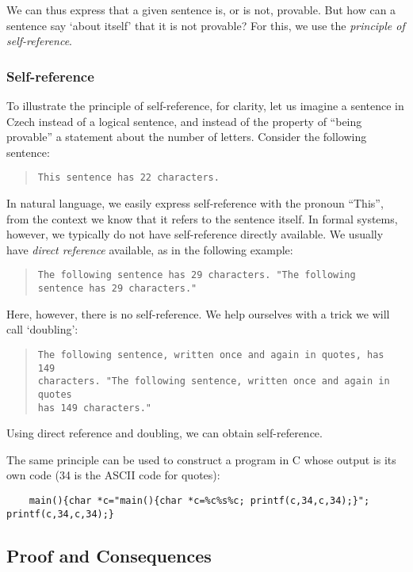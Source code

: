     We can thus express that a given sentence is, or is not, provable. But how can a sentence say `about itself' that it is not provable? For this, we use the \emph{principle of self-reference}.
    
    \subsubsection*{Self-reference}
    
    To illustrate the principle of self-reference, for clarity, let us imagine a sentence in Czech instead of a logical sentence, and instead of the property of ``being provable'' a statement about the number of letters. Consider the following sentence:
    \begin{quote}
        \texttt{This sentence has 22 characters.}
    \end{quote}
    In natural language, we easily express self-reference with the pronoun ``This'', from the context we know that it refers to the sentence itself. In formal systems, however, we typically do not have self-reference directly available. We usually have \emph{direct reference} available, as in the following example:
    \begin{quote}
        \texttt{The following sentence has 29 characters. "The following sentence has 29 characters."}
    \end{quote}
    Here, however, there is no self-reference. We help ourselves with a trick we will call `doubling':
    \begin{quote}
        \texttt{The following sentence, written once and again in quotes, has 149\\ characters. "The following sentence, written once and again in quotes\\ has 149 characters."}
    \end{quote}
    Using direct reference and doubling, we can obtain self-reference.
    \begin{remark}
        The same principle can be used to construct a program in C whose output is its own code (34 is the ASCII code for quotes):    
    {\small
    \begin{verbatim}
    main(){char *c="main(){char *c=%c%s%c; printf(c,34,c,34);}"; printf(c,34,c,34);}    
    \end{verbatim}
    }
    \end{remark}
    
    \subsection{Proof and Consequences}
    
